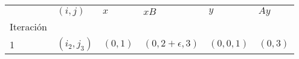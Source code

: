 \begin{tabular}{llllll}
\toprule
{} &       $(i, j)$ &              $x$ &                    $xB$ &                     $y$ &             $Ay$ \\
Iteración &                &                  &                         &                         &                  \\
\midrule
1         &  $(i_2, j_3)$ &  $(0, 1)$ &  $(0, 2 + \epsilon, 3)$ &  $(0, 0, 1)$ &  $(0 , 3)$ \\
\bottomrule
\end{tabular}
